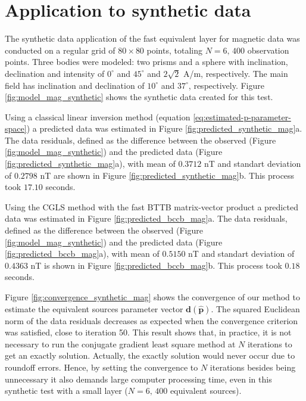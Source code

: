 \section{Application to synthetic data}

The synthetic data application of the fast equivalent layer for magnetic data was conducted on a regular grid of  $80 \times 80$ points, totaling $N = 6,\, 400$ observation points. Three bodies were modeled: two prisms and a sphere with inclination, declination and intensity of $0^{\circ}$ and $45^{\circ}$ and $2\sqrt{2}$ A/m, respectively. The main field has inclination and declination of $10^{\circ}$ and $37^{\circ}$, respectively. Figure \ref{fig:model_mag_synthetic} shows the synthetic data created for this test.

Using a classical linear inversion method (equation \ref{eq:estimated-p-parameter-space}) a predicted data was estimated in Figure \ref{fig:predicted_synthetic_mag}a. The data residuals,  defined as the difference between the observed (Figure \ref{fig:model_mag_synthetic}) and the predicted data 
(Figure \ref{fig:predicted_synthetic_mag}a), with mean of $0.3712$ nT and standart deviation of $0.2798$ nT are shown in Figure \ref{fig:predicted_synthetic_mag}b. This process took $17.10$ seconds.

Using the CGLS method with the fast BTTB matrix-vector product a predicted data was estimated in Figure \ref{fig:predicted_bccb_mag}a. The data residuals, defined as the difference  between the observed (Figure \ref{fig:model_mag_synthetic}) and the predicted data (Figure \ref{fig:predicted_bccb_mag}a), with mean of $0.5150$ nT and standart deviation of $0.4363$ nT is shown in Figure \ref{fig:predicted_bccb_mag}b. 
This process took $0.18$ seconds.

Figure \ref{fig:convergence_synthetic_mag} shows the convergence of our method to estimate the equivalent sources parameter vector $\mathbf{d}(\hat{\mathbf{p}})$. 
The squared Euclidean norm of the data residuals decreases as expected when the
convergence criterion was satisfied, close to iteration 50. 
This result shows that, in practice, it is not necessary to run the conjugate gradient least square method at $N$ iterations to get an exactly solution.
Actually, the exactly solution  would never occur due to roundoff errors.
Hence, by setting the convergence to  $N$ iterations besides being unnecessary it also demands large computer processing time, even in this synthetic test with a small layer 
($N = 6,\, 400$ equivalent sources). 

